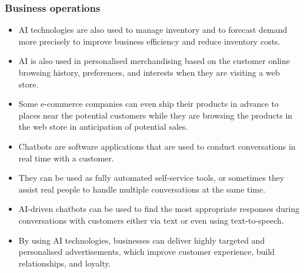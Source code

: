 \documentclass[11pt]{article}
\begin{document}
\subsubsection{Business operations}
\label{sec:org7a250c3}
\begin{itemize}
\item AI technologies are also used to manage inventory and to forecast demand more precisely to improve business efficiency and reduce inventory costs.
\item AI is also used in personalised merchandising based on the customer online browsing history, preferences, and interests when they are visiting a web store.
\item Some e-commerce companies can even ship their products in advance to places near the potential customers while they are browsing the products in the web store in anticipation of potential sales.
\item Chatbots are software applications that are used to conduct conversations in real time with a customer.
\item They can be used as fully automated self-service tools, or sometimes they assist real people to handle multiple conversations at the same time.
\item AI-driven chatbots can be used to find the most appropriate responses during conversations with customers either via text or even using text-to-speech.
\item By using AI technologies, businesses can deliver highly targeted and personalised advertisements, which improve customer experience, build relationships, and loyalty.
\end{itemize}

\clearpage
\end{document}
